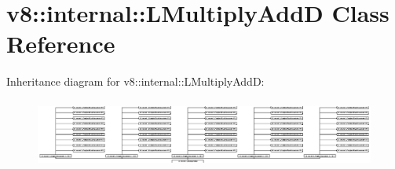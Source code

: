\hypertarget{classv8_1_1internal_1_1_l_multiply_add_d}{}\section{v8\+:\+:internal\+:\+:L\+Multiply\+AddD Class Reference}
\label{classv8_1_1internal_1_1_l_multiply_add_d}
Inheritance diagram for v8\+:\+:internal\+:\+:L\+Multiply\+AddD\+:\begin{figure}[H]
\begin{center}
\leavevmode
\includegraphics[height=2.289963cm]{classv8_1_1internal_1_1_l_multiply_add_d}
\end{center}
\end{figure}
